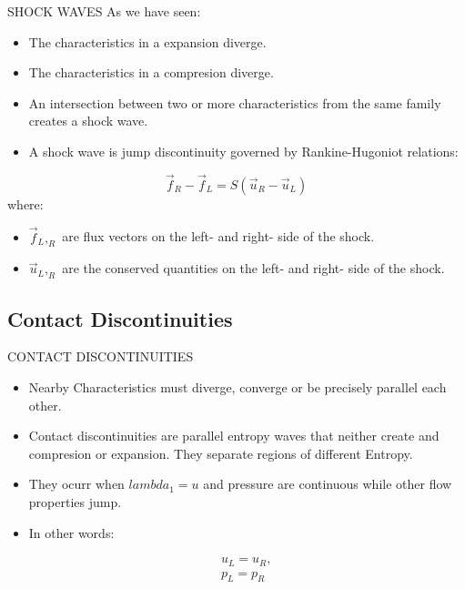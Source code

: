 \documentclass{beamer}
\begin{document}
\begin{frame}{SHOCK WAVES}
As we have seen:  
  \begin{itemize}
   \item The characteristics in a expansion diverge.
    \item The characteristics in a compresion diverge.
    \item An intersection between two or more characteristics from the same family creates a shock wave.
    \item A shock wave is jump discontinuity governed by Rankine-Hugoniot relations:
  \end{itemize}
    \begin{equation}
     \vec{f}_R-\vec{f}_L=S(\vec{u}_R-\vec{u}_L)
    \end{equation}
where:
  \begin{itemize}
   \item $\vec{f}_L,_R$ are flux vectors on the left- and right- side of the shock.
    \item $\vec{u}_L,_R$ are the conserved quantities on the left- and right- side of the shock.
  \end{itemize}
\end{frame}

\subsection{Contact Discontinuities}

\begin{frame}{CONTACT DISCONTINUITIES}
  \begin{itemize}
   \item Nearby Characteristics must diverge, converge or be precisely parallel each other. 
    \item Contact discontinuities are parallel entropy waves that neither create and compresion or expansion. They separate regions of different Entropy.
    \item They ocurr when $lambda_1=u$ and pressure are continuous while other flow properties jump. 
    \item In other words:
  \end{itemize}
  \begin{eqnarray}
    &&u_L=u_R,\\ 
    &&p_L=p_R
  \end{eqnarray}
\end{frame}
\end{document}
